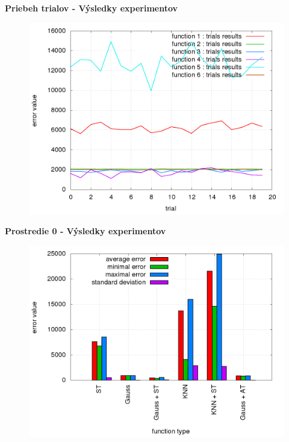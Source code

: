 \documentclass[xcolor=dvipsnames]{beamer}
\begin{document}
\begin{frame}{\bf Priebeh trialov - Výsledky experimentov}

\begin{figure}[!htb]
\centering
\includegraphics[scale=.36]{../../results_q_learning/map_1/trials_average_results_progress.png}
\end{figure}

\end{frame}



\begin{frame}{\bf Prostredie 0 - Výsledky experimentov}

\begin{figure}[!htb]
\centering
\includegraphics[scale=.36]{../../results_q_learning/map_0/trials_average_results.png}
\end{figure}

\end{frame}
\end{document}
